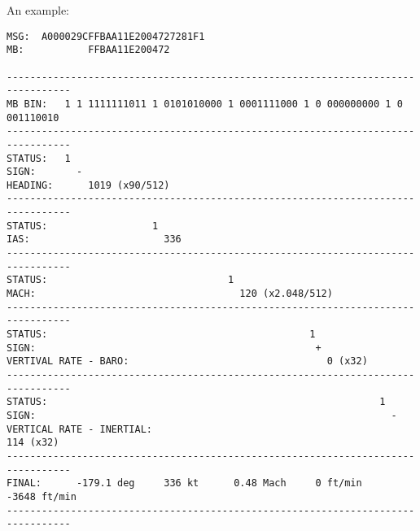 An example:

\begin{verbatim}
MSG:  A000029CFFBAA11E2004727281F1
MB:           FFBAA11E200472

---------------------------------------------------------------------------------
MB BIN:   1 1 1111111011 1 0101010000 1 0001111000 1 0 000000000 1 0 001110010
---------------------------------------------------------------------------------
STATUS:   1
SIGN:       -
HEADING:      1019 (x90/512)
---------------------------------------------------------------------------------
STATUS:                  1
IAS:                       336
---------------------------------------------------------------------------------
STATUS:                               1
MACH:                                   120 (x2.048/512)
---------------------------------------------------------------------------------
STATUS:                                             1
SIGN:                                                +
VERTIVAL RATE - BARO:                                  0 (x32)
---------------------------------------------------------------------------------
STATUS:                                                         1
SIGN:                                                             -
VERTICAL RATE - INERTIAL:                                           114 (x32)
---------------------------------------------------------------------------------
FINAL:      -179.1 deg     336 kt      0.48 Mach     0 ft/min     -3648 ft/min
---------------------------------------------------------------------------------
\end{verbatim}
